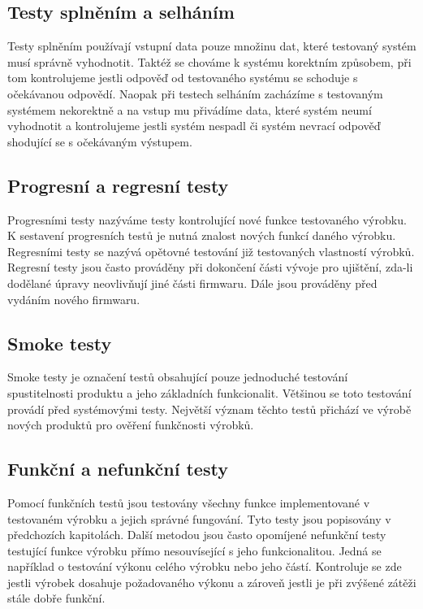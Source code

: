 \subsection{Testy splněním a selháním}
Testy splněním používají vstupní data pouze množinu dat, které testovaný systém musí správně vyhodnotit. Taktéž se chováme k systému korektním způsobem, při tom kontrolujeme jestli odpověď od testovaného systému se schoduje s očekávanou odpovědí. Naopak při testech selháním zacházíme s testovaným systémem nekorektně a na vstup mu přivádíme data, které systém neumí vyhodnotit a kontrolujeme jestli systém nespadl či systém nevrací odpověď shodující se s očekávaným výstupem.

\subsection{Progresní a regresní testy}
Progresními testy nazýváme testy kontrolující nové funkce testovaného výrobku. K sestavení progresních testů je nutná znalost nových funkcí daného výrobku. Regresními testy se nazývá opětovné testování již testovaných vlastností výrobků. Regresní testy jsou často prováděny při dokončení části vývoje pro ujištění, zda-li dodělané úpravy neovlivňují jiné části firmwaru. Dále jsou prováděny před vydáním nového firmwaru.

\subsection{Smoke testy}
Smoke testy je označení testů obsahující pouze jednoduché testování spustitelnosti produktu a jeho základních funkcionalit. Většinou se toto testování provádí před systémovými testy. Největší význam těchto testů přichází ve výrobě nových produktů pro ověření funkčnosti výrobků.

\subsection{Funkční a nefunkční testy}
Pomocí funkčních testů jsou testovány všechny funkce implementované v testovaném výrobku a jejich správné fungování. Tyto testy jsou popisovány v předchozích kapitolách. Další metodou jsou často opomíjené nefunkční testy testující funkce výrobku přímo nesouvísející s jeho funkcionalitou. Jedná se například o testování výkonu celého výrobku nebo jeho částí. Kontroluje se zde jestli výrobek dosahuje požadovaného výkonu a zároveň jestli je při zvýšené zátěži stále dobře funkční.

